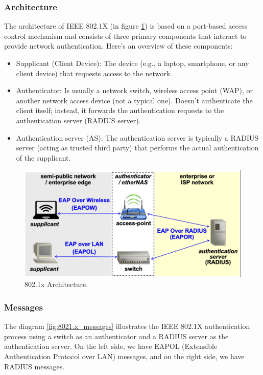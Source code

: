 \subsubsection{Architecture}
The architecture of IEEE 802.1X (in figure \ref{fig:8021x_architecture}) is based on a port-based access control mechanism and consists of three primary components that interact to provide network authentication. Here’s an overview of these components:
\begin{itemize}
    \item Supplicant (Client Device): The device (e.g., a laptop, smartphone, or any client device) that requests access to the network.
    \item Authenticator:  Is usually a network switch, wireless access point (WAP), or another network access device (not a typical one). Doesn’t authenticate the client itself; instead, it forwards the authentication requests to the authentication server (RADIUS server).
    \item Authentication server (AS): The authentication server is typically a RADIUS server (acting as trusted third party) that performs the actual authentication of the supplicant. 
\end{itemize}

\begin{figure}[H]
    \includegraphics[width=\linewidth]{Images/NetSec/8021x_architecture.png}
    \caption{802.1x Architecture.}
    \label{fig:8021x_architecture}
\end{figure}

\subsubsection{Messages}
The diagram \ref{fig:8021.x_messages} illustrates the IEEE 802.1X authentication process using a switch as an authenticator and a RADIUS server as the authentication server.
On the left side, we have EAPOL (Extensible Authentication Protocol over LAN) messages, and on the right side, we have RADIUS messages.


